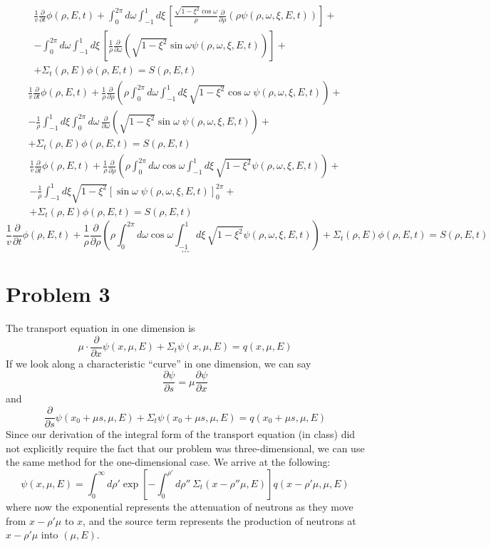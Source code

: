 \documentclass{article}
\newcommand{\p}{\partial}
\newcommand{\Xs}{\Sigma}
\newcommand{\intzi}{\int_0^{\infty}}
\begin{document}
\begin{align*}
\frac{1}{v}\frac{\p}{\p t}\phi(\rho,E,t) + \int_0^{2\pi} d\omega \int_{-1}^{1} d\xi \, \left[ \frac{\sqrt{1-\xi^2}\cos\omega}{\rho} \frac{\p}{\p \rho}\left( \rho\psi(\rho,\omega,\xi,E,t) \right)\right] + \\
- \int_0^{2\pi} d\omega \int_{-1}^{1} d\xi \, \left[ \frac{1}{\rho} \frac{\p}{\p \omega}\left( \sqrt{1-\xi^2}\sin\omega \psi(\rho,\omega,\xi,E,t) \right)\right] + \\
+ \Xs_t(\rho,E) \phi(\rho,E,t) = S(\rho,E,t)
\end{align*}
\begin{align*}
\frac{1}{v}\frac{\p}{\p t}\phi(\rho,E,t) + \frac{1}{\rho}\frac{\p}{\p \rho}\left(\rho \int_0^{2\pi} d\omega \int_{-1}^{1} d\xi \, \sqrt{1-\xi^2}\cos\omega \; \psi(\rho,\omega,\xi,E,t) \right) + \\
-\frac{1}{\rho} \int_{-1}^{1} d\xi \int_0^{2\pi} d\omega \, \frac{\p}{\p \omega}\left( \sqrt{1-\xi^2}\sin\omega \; \psi(\rho,\omega,\xi,E,t) \right) + \\
+ \Xs_t(\rho,E) \phi(\rho,E,t) = S(\rho,E,t)
\end{align*}
\begin{align*}
\frac{1}{v}\frac{\p}{\p t}\phi(\rho,E,t) + \frac{1}{\rho}\frac{\p}{\p \rho}\left(\rho \int_0^{2\pi} d\omega \cos\omega \int_{-1}^{1} d\xi \, \sqrt{1-\xi^2} \psi(\rho,\omega,\xi,E,t) \right) + \\
-\frac{1}{\rho} \int_{-1}^{1} d\xi \sqrt{1-\xi^2} \left[ \sin\omega \; \psi(\rho,\omega,\xi,E,t) \right]_0^{2\pi} + \\
+ \Xs_t(\rho,E) \phi(\rho,E,t) = S(\rho,E,t)
\end{align*}
$$ \frac{1}{v}\frac{\p}{\p t}\phi(\rho,E,t) + \frac{1}{\rho}\frac{\p}{\p \rho}\left(\rho \int_0^{2\pi} d\omega \cos\omega \int_{-1}^{1} d\xi \, \sqrt{1-\xi^2} \psi(\rho,\omega,\xi,E,t) \right) + \Xs_t(\rho,E) \phi(\rho,E,t) = S(\rho,E,t) $$
$$...$$




\section*{Problem 3}

The transport equation in one dimension is
$$ \mu \cdot \frac{\p}{\p x}\psi(x,\mu,E) + \Xs_t \psi(x,\mu,E) = q(x,\mu,E) $$
If we look along a characteristic ``curve'' in one dimension, we can say
$$ \frac{\p \psi}{\p s} = \mu \frac{\p \psi}{\p x} $$
and
$$ \frac{\p}{\p s} \psi(x_0+\mu s,\mu,E) + \Xs_t \psi(x_0+\mu s,\mu,E) = q(x_0+\mu s,\mu,E) $$
Since our derivation of the integral form of the transport equation (in class) did not explicitly require the fact that our problem was three-dimensional, we can use the same method for the one-dimensional case. We arrive at the following:
$$ \psi(x,\mu,E) = \intzi d\rho' \exp \left[ -\int_0^{\rho'} d\rho'' \, \Xs_t(x-\rho''\mu,E)\right] q(x-\rho'\mu,\mu,E) $$
where now the exponential represents the attenuation of neutrons as they move from $x-\rho' \mu$ to $x$, and the source term represents the production of neutrons at $x-\rho'\mu$ into $(\mu,E)$.
\end{document}
